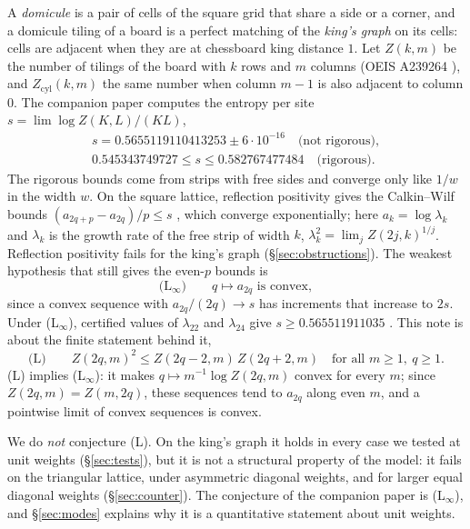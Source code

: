 \documentclass[11pt]{amsart}
\theoremstyle{definition}
\theoremstyle{remark}
\begin{document}
A \emph{domicule} is a pair of cells of the square grid that share a side or a corner, and a
domicule tiling of a board is a perfect matching of the \emph{king's graph} on its cells: cells are
adjacent when they are at chessboard king distance $1$. Let $Z(k, m)$ be the number of tilings of the
board with $k$ rows and $m$ columns (OEIS A239264 \cite{oeisA239264}), and $Z_{\mathrm{cyl}}(k, m)$
the same number when column $m - 1$ is also adjacent to column $0$. The companion paper
\cite{rylko2026entropy} computes the entropy per site $s = \lim \log Z(K, L)/(KL)$,
\begin{gather*}
  s = 0.5655119110413253 \pm 6\cdot10^{-16} \quad\text{(not rigorous)},\\
  0.545343749727 \le s \le 0.582767477484 \quad\text{(rigorous)}.
\end{gather*}
The rigorous bounds come from strips with free sides and converge only like $1/w$ in the width $w$.
On the square lattice, reflection positivity gives the Calkin--Wilf bounds
$(a_{2q+p} - a_{2q})/p \le s$ \cite{calkinwilf1998}, which converge exponentially; here
$a_k = \log\lambda_k$ and $\lambda_k$ is the growth rate of the free strip of width $k$,
$\lambda_k^2 = \lim_j Z(2j, k)^{1/j}$. Reflection positivity fails for the king's graph
(\S\ref{sec:obstructions}). The weakest hypothesis that still gives the even-$p$ bounds is
\begin{equation*}\label{eq:Linf}
  \text{(L$_\infty$)}\qquad q \mapsto a_{2q} \text{ is convex}, \tag{L$_\infty$}
\end{equation*}
since a convex sequence with $a_{2q}/(2q) \to s$ has increments that increase to $2s$. Under
(L$_\infty$), certified values of $\lambda_{22}$ and $\lambda_{24}$ give $s \ge 0.565511911035$
\cite[Prop.~8.2]{rylko2026entropy}. This note is about the finite statement behind it,
\begin{equation*}\label{eq:L}
  \text{(L)}\qquad Z(2q, m)^2 \le Z(2q - 2, m)\, Z(2q + 2, m) \quad\text{for all } m \ge 1,\ q \ge 1. \tag{L}
\end{equation*}
(L) implies (L$_\infty$): it makes $q \mapsto m^{-1}\log Z(2q, m)$ convex for every $m$; since
$Z(2q, m) = Z(m, 2q)$, these sequences tend to $a_{2q}$ along even $m$, and a pointwise limit of
convex sequences is convex.

We do \emph{not} conjecture (L). On the king's graph it holds in every case we tested at unit
weights (\S\ref{sec:tests}), but it is not a structural property of the model: it fails on the triangular
lattice, under asymmetric diagonal weights, and for larger equal diagonal weights
(\S\ref{sec:counter}). The conjecture of the companion paper is (L$_\infty$), and
\S\ref{sec:modes} explains why it is a quantitative statement about unit weights.
\end{document}
